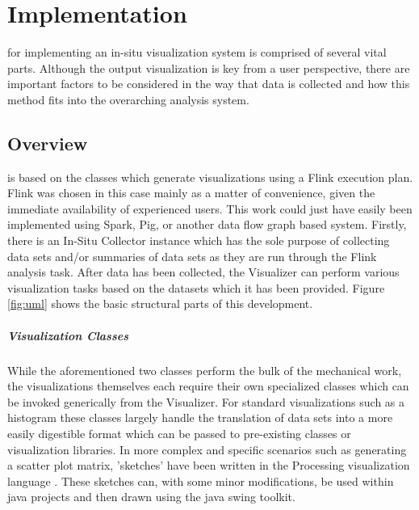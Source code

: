 \chapter{Implementation}
\label{sec:implementation}
 for implementing an in-situ visualization system is comprised of several vital parts. Although the  output visualization is key from a user perspective, there are important factors to be considered in the way that data is collected and how this method fits into the overarching analysis system. 
 
\section{Overview}
\label{sec:overview}
 is based on the classes which generate visualizations using a Flink execution plan. Flink was chosen in this case mainly as a matter of convenience, given the immediate availability of experienced users. This work could just have easily been implemented using Spark, Pig, or another data flow graph based system. Firstly, there is an In-Situ Collector instance which has the sole purpose of collecting data sets and/or summaries of data sets as they are run through the Flink analysis task. After data has been collected, the Visualizer can perform various visualization tasks based on the datasets which it has been provided. Figure \ref{fig:uml} shows the basic structural parts of this development. 

\paragraph{Visualization Classes}
While the aforementioned two classes perform the  bulk of the mechanical work, the visualizations themselves each require their own specialized classes which can be invoked generically from the Visualizer. For standard visualizations such as a histogram these classes largely handle the translation of data sets into a more easily digestible format which can be passed to pre-existing classes or visualization libraries. In more complex and specific scenarios such as generating a scatter plot matrix, 'sketches' have been written in the Processing visualization language \cite{Fry2015}. These sketches can, with some minor modifications, be used within java projects and then drawn using the java swing toolkit. 

